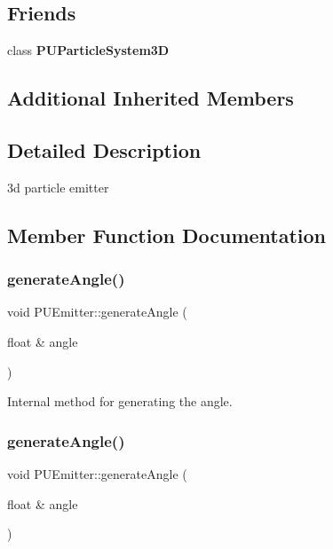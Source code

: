 \subsection*{Friends}
\begin{DoxyCompactItemize}
\item 
\mbox{\label{classPUEmitter_a6facc234295c573636e9e1f78b0777c8}} 
class {\bfseries P\+U\+Particle\+System3D}
\end{DoxyCompactItemize}
\subsection*{Additional Inherited Members}


\subsection{Detailed Description}
3d particle emitter 

\subsection{Member Function Documentation}
\mbox{\label{classPUEmitter_a5035190c6af34e7a8a6484b45720b28c}} 
\subsubsection{\texorpdfstring{generate\+Angle()}{generateAngle()}\hspace{0.1cm}{\footnotesize\ttfamily [1/2]}}
{\footnotesize\ttfamily void P\+U\+Emitter\+::generate\+Angle (\begin{DoxyParamCaption}\item[{float \&}]{angle }\end{DoxyParamCaption})\hspace{0.3cm}{\ttfamily [protected]}}

Internal method for generating the angle. \mbox{\label{classPUEmitter_a5035190c6af34e7a8a6484b45720b28c}} 
\subsubsection{\texorpdfstring{generate\+Angle()}{generateAngle()}\hspace{0.1cm}{\footnotesize\ttfamily [2/2]}}
{\footnotesize\ttfamily void P\+U\+Emitter\+::generate\+Angle (\begin{DoxyParamCaption}\item[{float \&}]{angle }\end{DoxyParamCaption})\hspace{0.3cm}{\ttfamily [protected]}}

